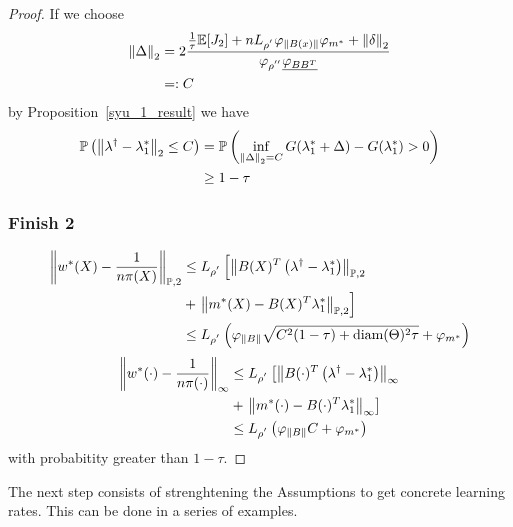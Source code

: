 \begin{proof}
If we choose
\begin{align*}
  \left\lVert\Delta\right\rVert_2
  &=
  2
  \frac{
    \frac{1}{\tau}
    \mathbb{E}[J_2]
    +
    n L_{\rho^{'}}\varphi_{\left\lVert B(x)\right\rVert} \varphi_{m^*}
    +
    \left\lVert\delta\right\rVert_2
  }
  {
   \varphi_{\rho^{''}}
  \underline{\varphi_{BB^T}}
  }
  \\
  &=:
  C
\end{align*}
by Proposition~\ref{syu_1_result} we have
\begin{align*}
  \mathbb{P}
  \left( 
      \left\lVert
        \lambda^\dagger
        -
        \lambda^*_1
      \right\rVert_2
      \le
      C 
  \right)
  &=
  \mathbb{P}
  \left( 
    \inf_{\left\lVert\Delta\right\rVert_2 = C}
    G(\lambda^*_1 + \Delta) 
    -
    G(\lambda^*_1)
    >
    0
  \right)
  \\
  &\ge
  1 - \tau
\end{align*}
\subsubsection*{Finish 2}
\begin{align*}
  \left\lVert
    w^*(X)
    -
    \frac{1}{n \pi(X)}
  \right\rVert_{\mathbb{P}, 2}
  &\le
  L_{\rho^{'}}
  \left[ 
    \left\lVert
      B(X)^T 
      \left(
        \lambda^\dagger
        -
        \lambda^*_1
      \right)
    \right\rVert_{\mathbb{P},2}
    \right.
    \\
    &+
    \left. 
    \left\lVert
      m^*(X)
      -
      B(X)^T 
      \lambda^*_1
    \right\rVert_{\mathbb{P},2}
  \right]
  \\
  &\le
  L_{\rho^{'}}
  \left(
    \varphi_{\left\lVert B\right\rVert}
    \sqrt{
      C^2(1 - \tau)
      +
      \text{diam}(\Theta)^2
      \tau
    } 
    +
    \varphi_{m^*}
  \right)
\end{align*}
\begin{align*}
  \left\lVert
    w^*(\cdot)
    -
    \frac{1}{n \pi(\cdot)}
  \right\rVert_{\infty}
  &\le
  L_{\rho^{'}}
  \left[ 
    \left\lVert
      B(\cdot)^T 
      \left(
        \lambda^\dagger
        -
        \lambda^*_1
      \right)
    \right\rVert_{\infty}
    \right.
    \\
    &+
    \left. 
    \left\lVert
      m^*(\cdot)
      -
      B(\cdot)^T 
      \lambda^*_1
    \right\rVert_{\infty}
  \right]
  \\
  &\le
  L_{\rho^{'}}
  \left(
    \varphi_{\left\lVert B\right\rVert}
    C
    +
    \varphi_{m^*}
  \right)
\end{align*}
with probabitity greater than 
$1 - \tau$.
\end{proof}
The next step consists of strenghtening the Assumptions to get concrete learning rates.
This can be done in a series of examples.
